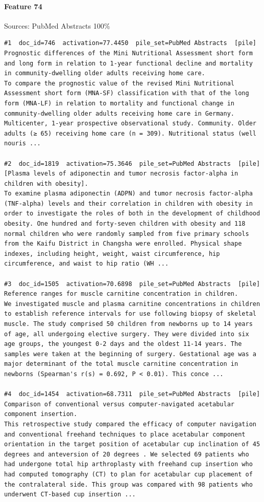 \paragraph*{Feature 74} Sources: PubMed Abstracts 100\%

\begin{verbatim}
#1  doc_id=746  activation=77.4450  pile_set=PubMed Abstracts  [pile]
Prognostic differences of the Mini Nutritional Assessment short form and long form in relation to 1-year functional decline and mortality in community-dwelling older adults receiving home care.
To compare the prognostic value of the revised Mini Nutritional Assessment short form (MNA-SF) classification with that of the long form (MNA-LF) in relation to mortality and functional change in community-dwelling older adults receiving home care in Germany. Multicenter, 1-year prospective observational study. Community. Older adults (≥ 65) receiving home care (n = 309). Nutritional status (well nouris ...

#2  doc_id=1819  activation=75.3646  pile_set=PubMed Abstracts  [pile]
[Plasma levels of adiponectin and tumor necrosis factor-alpha in children with obesity].
To examine plasma adiponectin (ADPN) and tumor necrosis factor-alpha (TNF-alpha) levels and their correlation in children with obesity in order to investigate the roles of both in the development of childhood obesity. One hundred and forty-seven children with obesity and 118 normal children who were randomly sampled from five primary schools from the Kaifu District in Changsha were enrolled. Physical shape indexes, including height, weight, waist circumference, hip circumference, and waist to hip ratio (WH ...

#3  doc_id=1505  activation=70.6898  pile_set=PubMed Abstracts  [pile]
Reference ranges for muscle carnitine concentration in children.
We investigated muscle and plasma carnitine concentrations in children to establish reference intervals for use following biopsy of skeletal muscle. The study comprised 50 children from newborns up to 14 years of age, all undergoing elective surgery. They were divided into six age groups, the youngest 0-2 days and the oldest 11-14 years. The samples were taken at the beginning of surgery. Gestational age was a major determinant of the total muscle carnitine concentration in newborns (Spearman's r(s) = 0.692, P < 0.01). This conce ...

#4  doc_id=1454  activation=68.7311  pile_set=PubMed Abstracts  [pile]
Comparison of conventional versus computer-navigated acetabular component insertion.
This retrospective study compared the efficacy of computer navigation and conventional freehand techniques to place acetabular component orientation in the target position of acetabular cup inclination of 45 degrees and anteversion of 20 degrees . We selected 69 patients who had undergone total hip arthroplasty with freehand cup insertion who had computed tomography (CT) to plan for acetabular cup placement of the contralateral side. This group was compared with 98 patients who underwent CT-based cup insertion ...


\end{verbatim}
